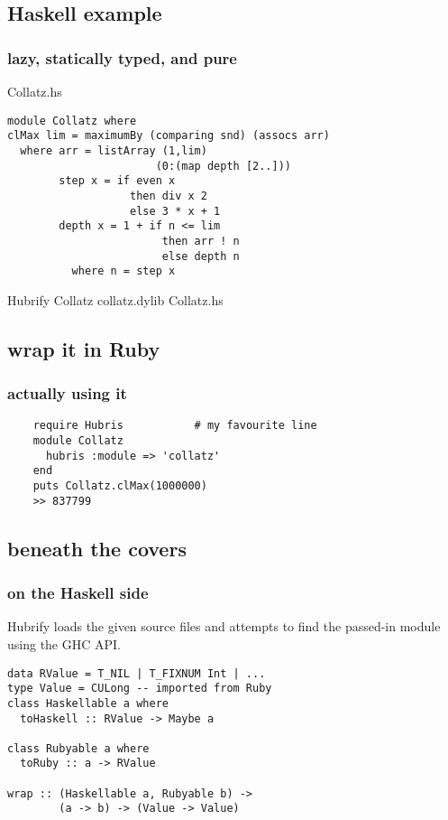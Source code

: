 \documentclass{beamer}
\begin{document}
\lstset{language=Haskell}
\subsection{Haskell example}
\begin{frame}[fragile]
  \frametitle{lazy, statically typed, and pure}
  Collatz.hs
  \begin{lstlisting}
module Collatz where
clMax lim = maximumBy (comparing snd) (assocs arr)
  where arr = listArray (1,lim)
                       (0:(map depth [2..]))
        step x = if even x
                   then div x 2
                   else 3 * x + 1
        depth x = 1 + if n <= lim
                        then arr ! n
                        else depth n
          where n = step x
  \end{lstlisting}
  Hubrify Collatz collatz.dylib Collatz.hs

\end{frame}

\subsection{wrap it in Ruby}
\begin{frame}[fragile]
  \frametitle{actually using it}
  \lstset{language=Ruby}
  \begin{lstlisting}
    require Hubris           # my favourite line
    module Collatz
      hubris :module => 'collatz'
    end
    puts Collatz.clMax(1000000)
    >> 837799
  \end{lstlisting}
\end{frame}

\subsection{beneath the covers}
\begin{frame}[fragile]
  \frametitle{on the Haskell side}
  Hubrify loads the given source files and attempts to find the
  passed-in module using the GHC API.
\lstset{language=Haskell}
\begin{lstlisting}
data RValue = T_NIL | T_FIXNUM Int | ...
type Value = CULong -- imported from Ruby
class Haskellable a where
  toHaskell :: RValue -> Maybe a

class Rubyable a where
  toRuby :: a -> RValue

wrap :: (Haskellable a, Rubyable b) ->
        (a -> b) -> (Value -> Value)
\end{lstlisting}
\end{frame}
\end{document}
